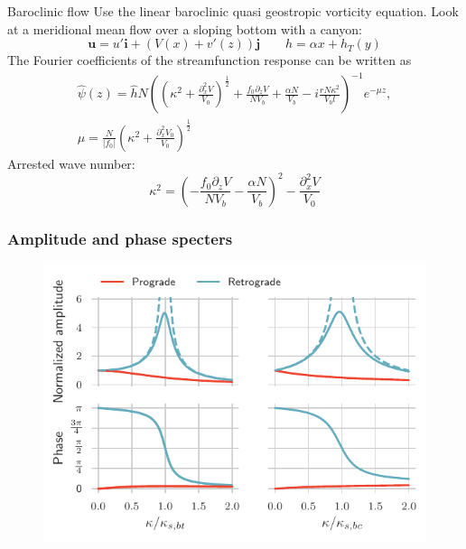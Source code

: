 \documentclass{beamer}
\newcommand{\pd}[1]{\partial_{#1}}
\newcommand{\pdd}[1]{\partial_{#1}^2}
\begin{document}
\begin{frame}{Baroclinic flow}
Use the linear baroclinic quasi geostropic vorticity equation. 
Look at a meridional mean flow over a sloping bottom with a canyon: 
\begin{equation*}
    \mathbf{u} = u'\mathbf{i} + \left(V(x)+v'(z)\right)\mathbf{j} \qquad h = \alpha x + h_T(y)
\end{equation*}
The Fourier coefficients of the streamfunction response can be written as
\begin{multline*}\label{eq:baroclinic:sol}
    \hat{\psi}(z) = \hat{h}N\left(\left(\kappa^2 + \frac{\pdd{x}V}{V_0} \right)^{\frac{1}{2}} + \frac{f_0\pd{z}V}{NV_b} + \frac{\alpha N}{V_b} - i\frac{rN\kappa^2}{V_bl}\right)^{-1}e^{-\mu z},\\ \mu = \frac{N}{|f_0|}\left( \kappa^2+\frac{\pdd{x}V_0}{V_0}\right)^{\frac{1}{2}} 
\end{multline*}
Arrested wave number:
\begin{equation*}
    \kappa^2 = \left(-\frac{f_0\pd{z}V}{NV_b} - \frac{\alpha N}{V_b}\right)^2 - \frac{\pdd{x}V}{V_0}
\end{equation*}
\end{frame}

\begin{frame}
\frametitle{Amplitude and phase specters}
\begin{figure}
\centering
\includegraphics{figures/amplitude_phase.pdf}
\end{figure}
\end{frame}
\end{document}
